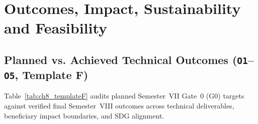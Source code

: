 
\chapter{Outcomes, Impact, Sustainability and Feasibility}

\begingroup
\fontsize{10.6}{12.5}\selectfont
\setlength{\parskip}{0.5pt}
\setlength{\intextsep}{5pt plus 1pt minus 1pt}
\titlespacing*{\section}{0pt}{2.5pt}{0.5pt}
\section{Planned vs. Achieved Technical Outcomes (\texttt{O1}--\texttt{O5}, Template F)}
Table~\ref{tab:ch8_templateF} audits planned Semester~VII Gate~0 (G0) targets against verified final Semester~VIII outcomes across technical deliverables, beneficiary impact boundaries, and SDG alignment.

